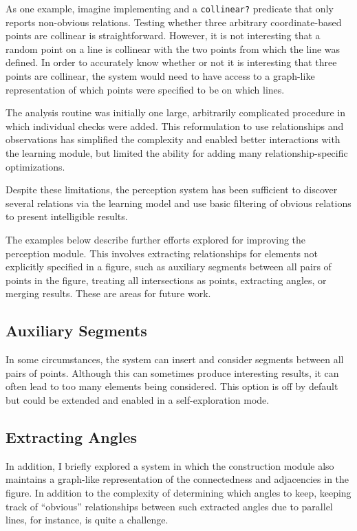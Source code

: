 As one example, imagine implementing and a \texttt{collinear?}
predicate that only reports non-obvious relations. Testing whether
three arbitrary coordinate-based points are collinear is
straightforward. However, it is not interesting that a random point on
a line is collinear with the two points from which the line was
defined. In order to accurately know whether or not it is interesting
that three points are collinear, the system would need to have access
to a graph-like representation of which points were specified to be on
which lines.

The analysis routine was initially one large, arbitrarily complicated
procedure in which individual checks were added. This reformulation to
use relationships and observations has simplified the complexity and
enabled better interactions with the learning module, but limited the
ability for adding many relationship-specific optimizations.

Despite these limitations, the perception system has been sufficient
to discover several relations via the learning model and use basic
filtering of obvious relations to present intelligible results.

The examples below describe further efforts explored for improving the
perception module. This involves extracting relationships for elements
not explicitly specified in a figure, such as auxiliary segments
between all pairs of points in the figure, treating all intersections
as points, extracting angles, or merging results. These are areas for
future work.

\subsection{Auxiliary Segments}

In some circumstances, the system can insert and consider segments
between all pairs of points. Although this can sometimes produce
interesting results, it can often lead to too many elements being
considered. This option is off by default but could be extended and
enabled in a self-exploration mode.

\subsection{Extracting Angles}

In addition, I briefly explored a system in which the construction
module also maintains a graph-like representation of the connectedness
and adjacencies in the figure. In addition to the complexity of
determining which angles to keep, keeping track of ``obvious''
relationships between such extracted angles due to parallel lines, for
instance, is quite a challenge.

